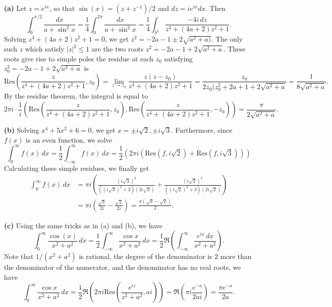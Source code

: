 \documentclass[11pt,letterpaper]{article}
\begin{document}
\begin{solution}
    \textbf{(a)} Let $z=e^{ix}$, so that $\sin(x)=(z+z^{-1})/2$ and $dz=ie^{ix}dx$. Then
    \[
        \int_0^{\pi /2} \frac{dx}{a+\sin^2 x} = \frac{1}{4}\int^{2\pi}_{0} \frac{dx}{a+\sin^2 x} = \frac{1}{4}\int_{S^1}\frac{-4i\,dz}{z^4+(4a+2)z^2+1}.
    \] 
    Solving $z^4+(4a+2)z^2+1=0$, we get $z^2=-2a-1\pm 2\sqrt{a^2+a)}$. The only such $z$ which satisfy $|z|^2\leq 1$ are the two roots $z^2=-2a-1+2\sqrt{a^2+a}$. These roots give rise to simple poles the residue at each $z_0$ satisfying $z_0^2=-2a-1+2\sqrt{a^2+a}$ is
    \[
        \textrm{Res}\left(\frac{z}{z^4+(4a+2)z^2+1}, z_0\right)=\lim_{z\to z_0}\frac{z(z-z_0)}{z^4+(4a+2)z^2+1} = \frac{z_0}{2z_0(z_0^2+2a+1+2\sqrt{a^2+a}}=\frac{1}{8\sqrt{a^2+a}}.
    \] 
    By the residue theorem, the integral is equal to 
    \[
        2\pi i \cdot \frac{1}{i}\left(\textrm{Res}\left(\frac{z}{z^4+(4a+2)z^2+1}, z_0\right), \textrm{Res}\left(\frac{z}{z^4+(4a+2)z^2+1}, -z_0\right)\right) = \frac{\pi}{2\sqrt{a^2+a}}.
    \] 

    \textbf{(b)} Solving $x^4+5x^2+6=0$, we get $x=\pm i\sqrt{2}, \pm i\sqrt{3}$. Furthermore, since $f(x)$ is an even function, we solve
    \[
        \int^\infty_0f(x)\,dx = \frac{1}{2}\int^\infty_{-\infty}f(x)\,dx=\frac{1}{2}\left(2\pi i\left(\textrm{Res}\left(f, i\sqrt{2}\right)+\textrm{Res}\left(f, i\sqrt{3}\right)\right)\right)
    \] 
    Calculating these simple residues, we finally get
    \[\begin{aligned}
        \int^\infty_0 f(x)\,dx &= \pi i\left(\frac{(i\sqrt{3})^2}{((i\sqrt{3})^2+2)(2i\sqrt{3})}+\frac{(i\sqrt{2})^2}{((i\sqrt{2})^2+3)(2i\sqrt{2})}\right)\\
                               &=\pi i\left(\frac{\sqrt{3}}{2i}-\frac{\sqrt{2}}{2i}\right)=\frac{\pi(\sqrt{3}-\sqrt{2})}{2}.
    \end{aligned}\]

    \textbf{(c)} Using the same tricks as in (a) and (b), we have
    \[
        \int^\infty_0 \frac{\cos(x)}{x^2+a^2}\,dx = \frac{1}{2}\int^\infty_{-\infty}\frac{\cos x}{x^2+a^2}\,dx = \frac{1}{2}\Re\left(\int^\infty_{-\infty}\frac{e^{ix}\,dx}{x^2+a^2}\right).
    \] 
    Note that $1/(x^2+a^2)$ is rational, the degree of the denominator is $2$ more than the denominator of the numerator, and the denominator has no real roots, we have
    \[
        \int^\infty_0 \frac{\cos x}{x^2+a^2}\,dx=\frac{1}{2}\Re\left(2\pi i \textrm{Res}\left(\frac{e^{iz}}{z^2+a^2}, ai\right)\right) = \Re\left(\pi i \frac{e^{-a}}{2ai}\right)=\frac{\pi e^{-a}}{2a}.
    \] 
\end{solution}
\end{document}
